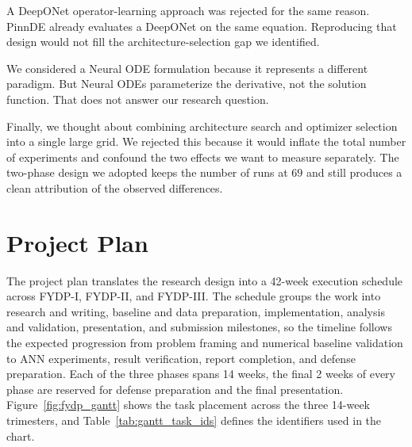 A DeepONet operator-learning approach was rejected for the same reason. PinnDE already evaluates a DeepONet on the same equation. Reproducing that design would not fill the architecture-selection gap we identified.

We considered a Neural ODE formulation because it represents a different paradigm. But Neural ODEs parameterize the derivative, not the solution function. That does not answer our research question.

Finally, we thought about combining architecture search and optimizer selection into a single large grid. We rejected this because it would inflate the total number of experiments and confound the two effects we want to measure separately. The two-phase design we adopted keeps the number of runs at $69$ and still produces a clean attribution of the observed differences.

\section{Project Plan}

The project plan translates the research design into a 42-week execution schedule across FYDP-I, FYDP-II, and FYDP-III. The schedule groups the work into research and writing, baseline and data preparation, implementation, analysis and validation, presentation, and submission milestones, so the timeline follows the expected progression from problem framing and numerical baseline validation to ANN experiments, result verification, report completion, and defense preparation. Each of the three phases spans 14 weeks, the final 2 weeks of every phase are reserved for defense preparation and the final presentation. Figure~\ref{fig:fydp_gantt} shows the task placement across the three 14-week trimesters, and Table~\ref{tab:gantt_task_ids} defines the identifiers used in the chart.


